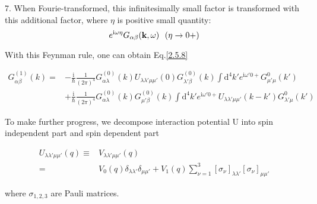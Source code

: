 7. When Fourie-transformed, this infinitesimally small factor is transformed with this additional factor, where $\eta$ is positive small quantity:
$$e^{\mathrm{i}\omega\eta}G_{\alpha\beta}({\bf k},\omega) \ \ (\eta\rightarrow0+)$$

With this Feynman rule, one can obtain Eq.\ref{2.5.8}

\begin{align}
G_{\alpha\beta}^{(1)}(k)=&-\frac{\mathrm{i}}{\hbar}\frac{1}{(2\pi)^4} G_{\alpha\lambda}^{(0)}(k)U_{\lambda\lambda'\mu\mu'}(0)G_{\lambda'\beta}^{(0)}(k)\int \mathrm{d}^4k'e^{\mathrm{i}\omega'0+}G_{\mu'\mu}^0(k') \nonumber \\
&+\frac{\mathrm{i}}{\hbar}\frac{1}{(2\pi)^4} G_{\alpha\lambda}^{(0)}(k)G_{\mu'\beta}^{(0)}(k)\int \mathrm{d}^4k'e^{\mathrm{i}\omega'0+}U_{\lambda\lambda'\mu\mu'}(k-k')G_{\lambda'\mu}^0(k') \nonumber
\end{align}

To make further progress, we decompose interaction potential U into spin independent part and spin dependent part 

\begin{align}
U_{\lambda\lambda'\mu\mu'}(q)\equiv& V_{\lambda\lambda'\mu\mu'}(q) \nonumber \\
=& V_0(q) \delta_{\lambda\lambda'}\delta_{\mu\mu'}+V_1(q)\sum_{\nu=1}^{3}[\sigma_{\nu}]_{\lambda\lambda'}[\sigma_{\nu}]_{\mu\mu'} \nonumber
\end{align}

where $\sigma_{1,2,3}$ are Pauli matrices.

